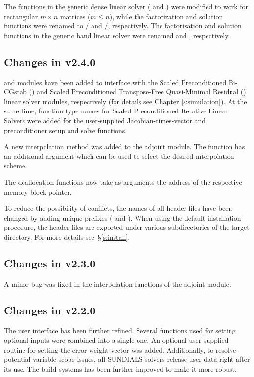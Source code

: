 The functions in the generic dense linear solver ( and
) were modified to work for rectangular $m \times n$
matrices ($m \le n$), while the factorization and solution functions were
renamed to / and /, 
respectively.
The factorization and solution functions in the generic band linear solver were 
renamed  and , respectively.

\subsection*{Changes in v2.4.0}

{\cvspbcg} and {\cvsptfqmr} modules have been added to interface with the
Scaled Preconditioned Bi-CGstab ({\spbcg}) and Scaled Preconditioned
Transpose-Free Quasi-Minimal Residual ({\sptfqmr}) linear solver modules,
respectively (for details see Chapter \ref{s:simulation}).
At the same time, function type names for Scaled Preconditioned Iterative
Linear Solvers were added for the user-supplied Jacobian-times-vector and
preconditioner setup and solve functions.

A new interpolation method was added to the {\cvodea} adjoint module. The
function  has an additional argument which can be used to select
the desired interpolation scheme.

The deallocation functions now take as arguments the address of the respective 
memory block pointer.

To reduce the possibility of conflicts, the names of all header files have
been changed by adding unique prefixes ( and ).
When using the default installation procedure, the header files are exported
under various subdirectories of the target  directory. For more
details see~\S\ref{s:install}.

\subsection*{Changes in v2.3.0}

A minor bug was fixed in the interpolation functions of the adjoint
{\cvodea} module.

\subsection*{Changes in v2.2.0}

The user interface has been further refined. Several functions used
for setting optional inputs were combined into a single one.  An
optional user-supplied routine for setting the error weight vector was
added.  Additionally, to resolve potential variable scope issues, all
SUNDIALS solvers release user data right after its use. The build
systems has been further improved to make it more robust.


